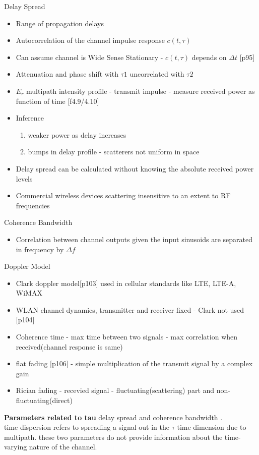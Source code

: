 \documentclass[11pt]{beamer}
\begin{document}
\begin{frame}{Delay Spread}
\begin{itemize}
\item Range of propagation delays
\item Autocorrelation of the channel impulse response $c(t,\tau)$
\item Can assume channel is Wide Sense Stationary - $c(t,\tau)$ depends on $\Delta t$ [p95]
\item Attenuation and phase shift with $\tau 1$ uncorrelated with $\tau 2$
\item $E_r$ multipath intensity profile - transmit impulse - measure received power as function of time [f4.9/4.10]
\item Inference 
\begin{enumerate}
\item weaker power as delay increases  
\item bumps in delay profile - scatterers not uniform in space 
\end{enumerate}
 \item Delay spread can be calculated without knowing the absolute received power levels
\item Commercial wireless devices scattering insensitive to an extent to RF frequencies
\end{itemize}
\end{frame}
\begin{frame}{Coherence Bandwidth}
\begin{itemize}
\item Correlation between channel outputs given the input sinusoids are separated in frequency by $\Delta f$
\end{itemize}
\end{frame}
\begin{frame}{Doppler Model}
\begin{itemize}
\item Clark doppler model[p103] used in cellular standards like LTE, LTE-A, WiMAX
\item WLAN channel dynamics, transmitter and receiver fixed - Clark not used [p104]
\item Coherence time - max time between two signals - max correlation when received(channel response is same)
\end{itemize}
\end{frame}

\begin{frame}
\begin{itemize}
\item flat fading [p106] - simple multiplication of the transmit signal by a complex gain
\item Rician fading - recevied signal - fluctuating(scattering) part and non-fluctuating(direct) 
\end{itemize}

\end{frame}

\begin{frame}
\textbf{Parameters related to tau}
delay spread and coherence bandwidth . \\
time dispersion refers to spreading a signal out in the $\tau$ time dimension due to multipath. these two parameters do not provide information about the time-varying nature of the channel. 
\end{frame}
\end{document}
